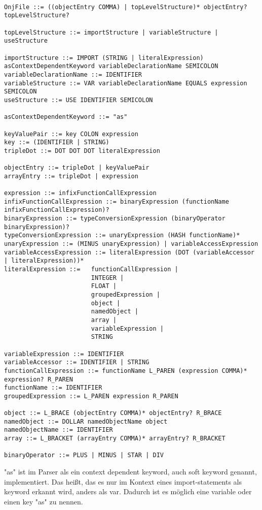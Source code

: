 \begin{verbatim}
    
OnjFile ::= ((objectEntry COMMA) | topLevelStructure)* objectEntry? topLevelStructure?

topLevelStructure ::= importStructure | variableStructure | useStructure

importStructure ::= IMPORT (STRING | literalExpression) asContextDependentKeyword variableDeclarationName SEMICOLON
variableDeclarationName ::= IDENTIFIER
variableStructure ::= VAR variableDeclarationName EQUALS expression SEMICOLON
useStructure ::= USE IDENTIFIER SEMICOLON

asContextDependentKeyword ::= "as"

keyValuePair ::= key COLON expression
key ::= (IDENTIFIER | STRING)
tripleDot ::= DOT DOT DOT literalExpression

objectEntry ::= tripleDot | keyValuePair
arrayEntry ::= tripleDot | expression

expression ::= infixFunctionCallExpression
infixFunctionCallExpression ::= binaryExpression (functionName infixFunctionCallExpression)?
binaryExpression ::= typeConversionExpression (binaryOperator binaryExpression)?
typeConversionExpression ::= unaryExpression (HASH functionName)*
unaryExpression ::= (MINUS unaryExpression) | variableAccessExpression
variableAccessExpression ::= literalExpression (DOT (variableAccessor | literalExpression))*
literalExpression ::=   functionCallExpression |
                        INTEGER |
                        FLOAT |
                        groupedExpression |
                        object |
                        namedObject |
                        array |
                        variableExpression |
                        STRING

variableExpression ::= IDENTIFIER
variableAccessor ::= IDENTIFIER | STRING
functionCallExpression ::= functionName L_PAREN (expression COMMA)* expression? R_PAREN
functionName ::= IDENTIFIER
groupedExpression ::= L_PAREN expression R_PAREN

object ::= L_BRACE (objectEntry COMMA)* objectEntry? R_BRACE
namedObject ::= DOLLAR namedObjectName object
namedObjectName ::= IDENTIFIER
array ::= L_BRACKET (arrayEntry COMMA)* arrayEntry? R_BRACKET

binaryOperator ::= PLUS | MINUS | STAR | DIV

\end{verbatim}

\begin{infoBox}
    "as" ist im Parser als ein context dependent keyword, auch soft keyword genannt, implementiert.
    Das heißt, das es nur im Kontext eines import-statements als keyword erkannt wird, anders als \zB var.
    Dadurch ist es möglich eine variable oder einen key "as" zu nennen.
\end{infoBox}

\renewcommand{\kapitelautor}{}
